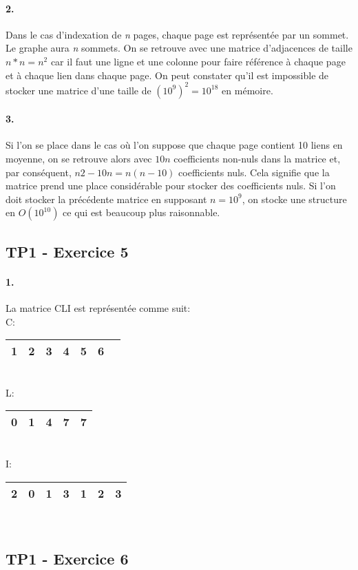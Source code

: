 \documentclass[10pt,a4paper]{article}
\begin{document}
\paragraph{2.} Dans le cas d'indexation de \textit{n} pages, chaque page est représentée par un sommet. Le graphe aura \textit{n} sommets. On se retrouve avec une matrice d'adjacences de taille $n*n = n^2$ car il faut une ligne et une colonne pour faire référence à chaque page et à chaque lien dans chaque page. On peut constater qu'il est  impossible de stocker une matrice d'une taille de  $(10^9)^2 = 10^{18}$ en mémoire.

\paragraph{3.} Si l'on se place dans le cas où l'on suppose que chaque page contient 10 liens en moyenne, on se retrouve alors avec $10n$ coefficients non-nuls dans la matrice et, par conséquent, $n2-10n = n(n-10)$ coefficients nuls. Cela signifie que la matrice prend une place considérable pour stocker des coefficients nuls. Si l'on doit stocker la précédente matrice en supposant $n = 10^9$, on stocke une structure en $O(10^{10})$ ce qui est beaucoup plus raisonnable.  

\subsection{TP1 - Exercice 5}
\paragraph{1.} La matrice CLI est représentée comme suit: \\
C:
\begin{tabular}{ |c|c|c|c|c|c|c| } 
 \hline
 1 & 2 & 3 & 4 & 5 & 6 \\
 \hline
\end{tabular} \\
L: 
\begin{tabular}{ |c|c|c|c|c| } 
 \hline
 0 & 1 & 4 & 7 & 7 \\
 \hline
\end{tabular} \\
I:
\begin{tabular}{ |c|c|c|c|c|c|c| } 
 \hline
 2 & 0 & 1 & 3 & 1 & 2 & 3 \\
 \hline
\end{tabular} \\

\subsection{TP1 - Exercice 6}
\end{document}
